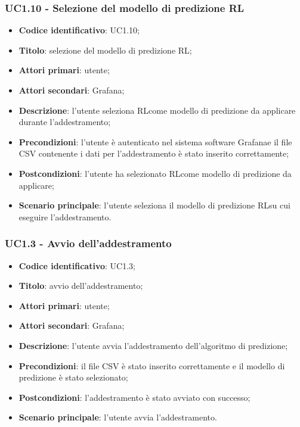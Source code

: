 \subsubsection{UC1.10 - Selezione del modello di predizione RL}
\begin{itemize}
	\item \textbf{Codice identificativo}: UC1.10;
	\item \textbf{Titolo}: selezione del modello di predizione RL\glo;
	\item \textbf{Attori primari}: utente;
	\item \textbf{Attori secondari}: Grafana\glo;
	\item \textbf{Descrizione}: l'utente seleziona RL\glosp come modello di predizione da applicare durante l'addestramento;
	\item \textbf{Precondizioni}: l'utente è autenticato nel sistema software Grafana\glosp e il file CSV contenente i dati per l'addestramento è stato inserito correttamente;
	\item \textbf{Postcondizioni}: l'utente ha selezionato RL\glosp come modello di predizione da applicare;
	\item \textbf{Scenario principale}: l'utente seleziona il modello di predizione RL\glosp su cui eseguire l'addestramento.
\end{itemize}

\subsubsection{UC1.3 - Avvio dell'addestramento}
\begin{itemize}
	\item \textbf{Codice identificativo}: UC1.3;
	\item \textbf{Titolo}: avvio dell'addestramento;
	\item \textbf{Attori primari}: utente;
	\item \textbf{Attori secondari}: Grafana\glo;
	\item \textbf{Descrizione}: l'utente avvia l'addestramento dell'algoritmo di predizione;
	\item \textbf{Precondizioni}: il file CSV è stato inserito correttamente e il modello di predizione è stato selezionato;
	\item \textbf{Postcondizioni}: l'addestramento è stato avviato con successo;
	\item \textbf{Scenario principale}: l'utente avvia l'addestramento.
\end{itemize}

